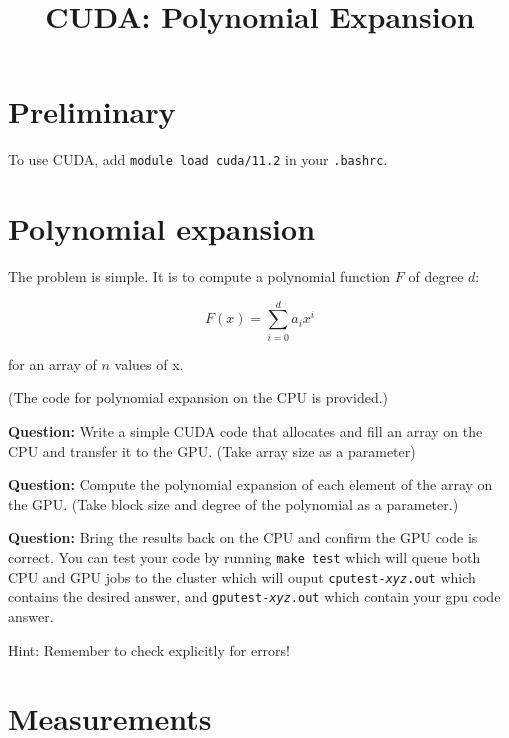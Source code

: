 \documentclass[letter]{article}
\title{CUDA: Polynomial Expansion}
\date{}
\newcommand{\question}{{\noindent \bf Question: }}
\begin{document}
\maketitle

\section{Preliminary}

To use CUDA, add \texttt{module load cuda/11.2} in your \texttt{.bashrc}.%



\section{Polynomial expansion}

The problem is simple. It is to compute a polynomial function $F$ of degree $d$:

$$F(x) = \sum_{i=0}^d a_i x^i$$

for an array of $n$ values of x.

(The code for polynomial expansion on the CPU is provided.)

\question Write a simple CUDA code that allocates and fill an array on
the CPU and transfer it to the GPU. (Take array size as a parameter)

\question Compute the polynomial expansion of each element of the
array on the GPU. (Take block size and degree of the polynomial as a
parameter.)

\question Bring the results back on the CPU and confirm the GPU code
is correct. You can test your code by running \texttt{make test} which
will queue both CPU and GPU jobs to the cluster which will ouput
\texttt{cputest-\textit{xyz}.out} which contains the desired answer, and
\texttt{gputest-\textit{xyz}.out} which contain your gpu code answer.

Hint: Remember to check explicitly for errors!

\section{Measurements}
\end{document}
